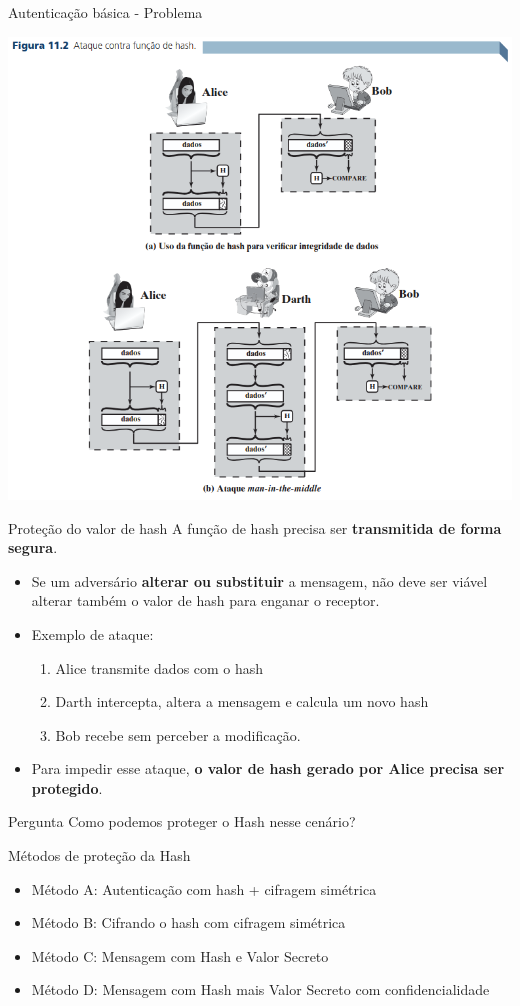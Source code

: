 \begin{frame}{Autenticação básica - Problema}

\centering
\includegraphics[width=0.6\linewidth]{Figuras/mitm-autenticacao-hash.png}


\end{frame}


\begin{frame}{Proteção do valor de hash}
A função de hash precisa ser \textbf{transmitida de forma segura}.  

\medskip

\begin{itemize}
    \item Se um adversário \textbf{alterar ou substituir} a mensagem, não deve ser viável alterar também o valor de hash para enganar o receptor.
    \item Exemplo de ataque: 
    \begin{enumerate}
        \item Alice transmite dados com o hash 
        \item Darth intercepta, altera a mensagem e calcula um novo hash
        \item Bob recebe sem perceber a modificação.
    \end{enumerate}
    \item Para impedir esse ataque, \textbf{o valor de hash gerado por Alice precisa ser protegido}.
\end{itemize}

\begin{block}{Pergunta}
    Como podemos proteger o Hash nesse cenário?
\end{block}
\end{frame}

\begin{frame}{Métodos de proteção da Hash}
    \begin{itemize}
        \item Método A: Autenticação com hash + cifragem simétrica
        \item Método B: Cifrando o hash com cifragem simétrica
        \item Método C: Mensagem com Hash e Valor Secreto
        \item Método D: Mensagem com Hash mais Valor Secreto com confidencialidade
    \end{itemize}
    
\end{frame}

